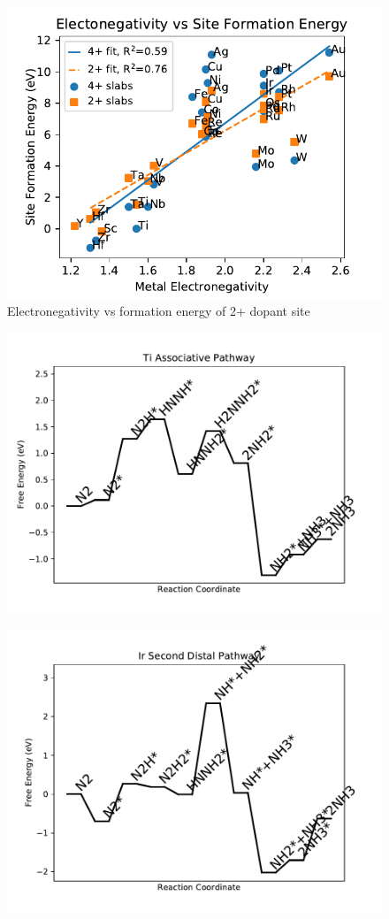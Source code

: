 \begin{figure}
\centering
\includegraphics[width=0.8\linewidth]{Images/electronegativity_vs_formation.pdf}
\caption{Electronegativity vs formation energy of 2+ dopant site}
\label{fig:electronegativity}
\end{figure}

\begin{figure}
\includegraphics[width=0.5\linewidth]{data/plots/Ti_associative.pdf}
\label{fig:Ti_associative}
\end{figure}

\begin{figure}
\includegraphics[width=0.5\linewidth]{data/plots/Ir_distal_2.pdf}
\label{fig:Ir_distal_2}
\end{figure}

